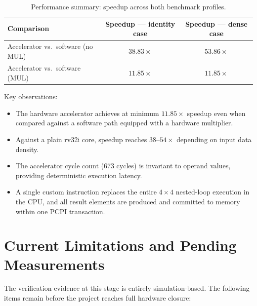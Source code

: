 ﻿\documentclass[12pt,a4paper]{report}
\renewcommand{\arraystretch}{1.2}
\begin{document}
\begin{table}[H]
\centering
\small
\setlength{\tabcolsep}{8pt}
\renewcommand{\arraystretch}{1.4}
\begin{tabular}{lcc}
\toprule
\textbf{Comparison} & \textbf{Speedup --- identity case} & \textbf{Speedup --- dense case} \\
\midrule
Accelerator vs.\ software (no MUL) & $38.83\times$ & $53.86\times$ \\
Accelerator vs.\ software (MUL)    & $11.85\times$ & $11.85\times$ \\
\bottomrule
\end{tabular}
\caption{Performance summary: speedup across both benchmark profiles.}
\label{tab:speedup_summary}
\end{table}

Key observations:

\begin{itemize}
    \item The hardware accelerator achieves at minimum $11.85\times$ speedup even when compared against a software path equipped with a hardware multiplier.
    \item Against a plain rv32i core, speedup reaches $38$--$54\times$ depending on input data density.
    \item The accelerator cycle count (673 cycles) is invariant to operand values, providing deterministic execution latency.
    \item A single custom instruction replaces the entire $4 \times 4$ nested-loop execution in the CPU, and all result elements are produced and committed to memory within one PCPI transaction.
\end{itemize}

\section{Current Limitations and Pending Measurements}

The verification evidence at this stage is entirely simulation-based.
The following items remain before the project reaches full hardware closure:
\end{document}
